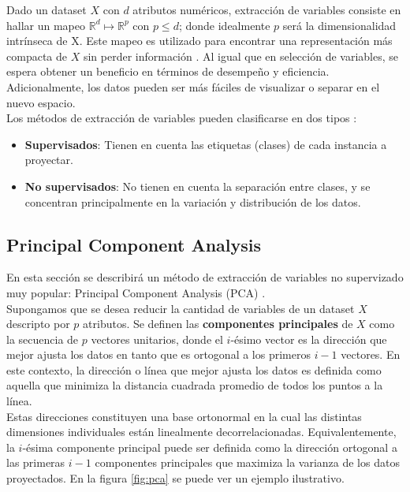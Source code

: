Dado un dataset $X$ con $d$ atributos numéricos, extracción de variables consiste en hallar un mapeo $\mathds{R}^d \mapsto \mathds{R}^p$ con $p \leq d$; donde idealmente $p$ será la dimensionalidad intrínseca de X. Este mapeo es utilizado para encontrar una representación más compacta de $X$ sin perder información \cite{fextraction}. Al igual que en selección de variables, se espera obtener un beneficio en términos de desempeño y eficiencia. Adicionalmente, los datos pueden ser más fáciles de visualizar o separar en el nuevo espacio. \\

Los métodos de extracción de variables pueden clasificarse en dos tipos \cite{fextraction}: 
\begin{itemize}
\item \textbf{Supervisados}: Tienen en cuenta las etiquetas (clases) de cada instancia a proyectar.
\item \textbf{No supervisados}: No tienen en cuenta la separación entre clases, y se concentran principalmente en la variación y distribución de los datos.
\end{itemize}

\subsection{Principal Component Analysis}

\label{PCA}

En esta sección se describirá un método de extracción de variables no supervizado muy popular: Principal Component Analysis (PCA) \cite{han2012mining}. \\

Supongamos que se desea reducir la cantidad de variables de un dataset $X$ descripto por $p$ atributos. Se definen las \textbf{componentes principales} de $X$ como la secuencia de $p$ vectores unitarios, donde el $i$-ésimo vector es la dirección que mejor ajusta los datos en tanto que es ortogonal a los primeros $i-1$ vectores. En este contexto, la dirección o línea que mejor ajusta los datos es definida como aquella que minimiza la distancia cuadrada promedio de todos los puntos a la línea. \\

Estas direcciones constituyen una base ortonormal en la cual las distintas dimensiones individuales están linealmente decorrelacionadas.  Equivalentemente, la $i$-ésima componente principal puede ser definida como la dirección ortogonal a las primeras $i-1$ componentes principales que maximiza la varianza de los datos proyectados. En la figura \ref{fig:pca} se puede ver un ejemplo ilustrativo.  \\

